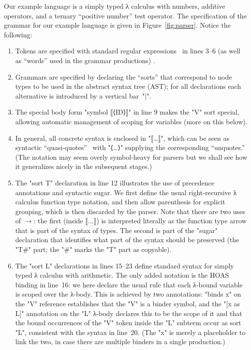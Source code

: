 \documentclass[letterpaper]{article}
\begin{document}
\begin{example}
  Our example language is a simply typed λ calculus with numbers, additive operators, and a ternary
  ``positive number'' test operator.  The \HAX specification of the grammar for our example language
  is given in Figure~\ref{fig:parser}. Notice the following:
  \begin{enumerate}

  \item Tokens are specified with standard regular expressions~\cite{man:regex} in lines 3--6 (as
    well as ``words'' used in the grammar productions) .

  \item Grammars are specified by declaring the ``sorts'' that correspond to node types to be used
    in the abstract syntax tree (AST); for all declarations each alternative is introduced by a
    vertical bar~"|".

  \item The special body form "symbol ⟦⟨ID⟩⟧" in line 9 makes the "V" sort special, allowing
    automatic management of scoping for variables (more on this below).

  \item In general, all concrete syntax is enclosed in "⟦…⟧", which can be seen as syntactic
    ``quasi-quotes''~\cite{Quine:1940} with "⟨…⟩" supplying the corresponding ``unquotes.'' (The
    notation may seem overly symbol-heavy for parsers but we shall see how it generalizes nicely in
    the subsequent stages.)

  \item The "sort T" declaration in line 12 illustrates the use of precedence annotations and
    syntactic sugar. We first define the usual right-recursive λ calculus function type notation,
    and then allow parenthesis for explicit grouping, which is then discarded by the parser.  Note
    that there are two uses of $→$: the first (inside $⟦…⟧$) is interpreted literally as the
    function type arrow that is part of the syntax of types. The second is part of the "sugar"
    declaration that identifies what part of the syntax should be preserved (the "T#" part; the "#"
    marks the "T" part as copyable).

  \item The "sort L" declarations in lines 15--23 define standard syntax for simply typed λ calculus
    with arithmetic. The only added notation is the HOAS binding in line~16: we here declare the
    usual rule that each λ-bound variable is scoped over the λ-body. This is achieved by two
    annotations: "binds x" on the "V" reference establishes that the "V" is a binder symbol, and the
    "[x as L]" annotation on the "L" λ-body declares this to be the scope of it and that the
    bound occurrences of the "V" token inside the "L" subterm occur as sort "L", consistent with the
    syntax in line~20. (The "x" is merely a placeholder to link the two, in case there are multiple
    binders in a single production.)


\end{enumerate}
\end{example}
\end{document}
